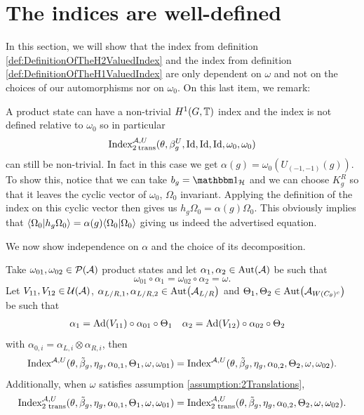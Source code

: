 \documentclass[11pt,a4paper,twoside]{article}
\numberwithin{equation}{section}
\begin{document}
	\section{The indices are well-defined}\label{sec:IndexIsInvariantUnderChoices}
	In this section, we will show that the index from definition \ref{def:DefinitionOfTheH2ValuedIndex} and the index from definition \ref{def:DefinitionOfTheH1ValuedIndex} are only dependent on $\omega$ and not on the choices of our automorphisms nor on $\omega_0$. On this last item, we remark:
	\begin{remark}\label{rem:NontrivialProductState}
		A product state can have a non-trivial $H^1(G,\TT)$ index and the index is not defined relative to $\omega_0$ so in particular
		\begin{equation}
			\textrm{Index}_{2\:\text{trans}}^{\AA,U}(\theta,\beta_g^U,\textrm{Id},\textrm{Id},\textrm{Id},\omega_0,\omega_0)
		\end{equation}
		can still be non-trivial. In fact in this case we get $\alpha(g)=\omega_0(U_{(-1,-1)}(g))$. To show this, notice that we can take $b_g=\id_{\HH}$ and we can choose $K_g^R$ so that it leaves the cyclic vector of $\omega_0$, $\Omega_0$ invariant. Applying the definition of the index on this cyclic vector then gives us $h_g\Omega_0=\alpha(g)\Omega_0$. This obviously implies that $\bra{\Omega_0}\ket{h_g\Omega_0}=\alpha(g)\bra{\Omega_0}\ket{\Omega_0}$ giving us indeed the advertised equation.
	\end{remark}
	We now show independence on $\alpha$ and the choice of its decomposition.
	\begin{lemma}
		Take $\omega_{01},\omega_{02}\in\PP(\AA)$ product states and let $\alpha_1,\alpha_2\in\Aut{\AA}$ be such that
		\begin{equation}
			\omega_{01}\circ\alpha_1=\omega_{02}\circ\alpha_2=\omega.
		\end{equation}
		Let $V_{11},V_{12}\in\UU(\AA)$, $\alpha_{L/R,1},\alpha_{L/R,2}\in\Aut{\AA_{L/R}}$ and $\Theta_1,\Theta_2\in \Aut{\AA_{W(C_\theta)^c}}$ be such that
		\begin{align}
			\alpha_1&=\Ad{V_{11}}\circ\alpha_{01}\circ\Theta_1&\alpha_2&=\Ad{V_{12}}\circ\alpha_{02}\circ \Theta_2
		\end{align}
		with $\alpha_{0,i}=\alpha_{L,i}\otimes\alpha_{R,i}$, then
		\begin{equation}
			\textrm{Index}^{\AA,U}(\theta,\tilde{\beta}_g,\eta_g,\alpha_{0,1},\Theta_1,\omega,\omega_{01})=\textrm{Index}^{\AA,U}(\theta,\tilde{\beta}_g,\eta_g,\alpha_{0,2},\Theta_2,\omega,\omega_{02}).
		\end{equation}
		Additionally, when $\omega$ satisfies assumption \ref{assumption:2Translations},
		\begin{equation}
			\textrm{Index}^{\AA,U}_{\text{2 trans}}(\theta,\tilde{\beta}_g,\eta_g,\alpha_{0,1},\Theta_1,\omega,\omega_{01})=\textrm{Index}^{\AA,U}_{\text{2 trans}}(\theta,\tilde{\beta}_g,\eta_g,\alpha_{0,2},\Theta_2,\omega,\omega_{02}).
		\end{equation}
	\end{lemma}
\end{document}

